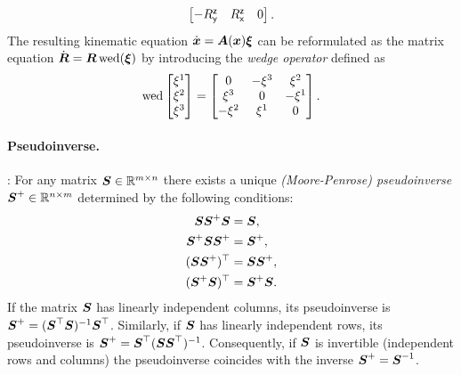 \begin{Example}
\begin{align}
\begin{bmatrix}
  -R^{\mathsf{z}}_{\mathsf{y}} & R^{\mathsf{z}}_{\mathsf{x}} & 0
 \end{bmatrix}.
\end{align}
The resulting kinematic equation $\dot{\boldsymbol{x}} = \boldsymbol{A}(\boldsymbol{x}) \boldsymbol{\xi}$ can be reformulated as the matrix equation $\dot{\boldsymbol{R}} = \boldsymbol{R} \operatorname{wed}(\boldsymbol{\xi})$ by introducing the \textit{wedge operator} defined as
\begin{align}
 \operatorname{wed} \begin{bmatrix} \xi^{1} \\ \xi^{2} \\ \xi^{3} \end{bmatrix} = \begin{bmatrix} 0 & -\xi^{3} & \xi^{2} \\ \xi^{3} & 0 & -\xi^{1} \\ -\xi^{2} & \xi^{1} & 0 \end{bmatrix}.
\end{align}
\end{Example}

\paragraph{Pseudoinverse.}
\cite[Theo.\ 1]{Penrose:Pseudoinverse}:
For any matrix $\boldsymbol{S}\in\mathbb{R}^{m\times n}$ there exists a unique \textit{(Moore-Penrose) pseudoinverse} $\boldsymbol{S}^+ \in \mathbb{R}^{n\times m}$ determined by the following conditions:
\begin{subequations}\label{eq:PenroseConditions}
\begin{align}
 \boldsymbol{S} \boldsymbol{S}^+ \boldsymbol{S} &= \boldsymbol{S},
\\
 \boldsymbol{S}^+ \boldsymbol{S} \boldsymbol{S}^+ &= \boldsymbol{S}^+,
\\
 (\boldsymbol{S} \boldsymbol{S}^+)^\top &= \boldsymbol{S} \boldsymbol{S}^+,
\\
 (\boldsymbol{S}^+ \boldsymbol{S})^\top &= \boldsymbol{S}^+ \boldsymbol{S}.
\end{align}
\end{subequations}
If the matrix $\boldsymbol{S}$ has linearly independent columns, its pseudoinverse is $\boldsymbol{S}^+ = (\boldsymbol{S}^\top \boldsymbol{S})^{-1} \boldsymbol{S}^\top$.
Similarly, if $\boldsymbol{S}$ has linearly independent rows, its pseudoinverse is $\boldsymbol{S}^+ = \boldsymbol{S}^\top (\boldsymbol{S} \boldsymbol{S}^\top)^{-1}$.
Consequently, if $\boldsymbol{S}$ is invertible (independent rows and columns) the pseudoinverse coincides with the inverse $\boldsymbol{S}^+ = \boldsymbol{S}^{-1}$.


